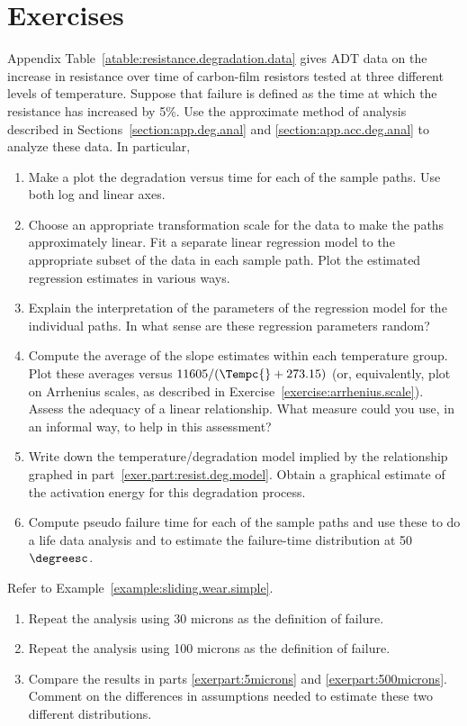 \section*{Exercises}


\begin{exercise}
\label{exercise:resist.deg.data}
Appendix Table~\ref{atable:resistance.degradation.data} gives ADT
data on the increase in resistance over time of carbon-film
resistors tested at three different levels of temperature.  Suppose
that failure is defined as the time at which the resistance has
increased by 5\%. Use the approximate method of analysis described
in Sections~\ref{section:app.deg.anal} and
\ref{section:app.acc.deg.anal} to analyze these data. In particular,
\begin{enumerate}
\item
Make a plot the degradation versus time for each of the sample
paths.  Use both log and linear axes.
\item
Choose an appropriate transformation scale for the data to make the
paths approximately linear. Fit a separate linear regression model
to the appropriate subset of the data in each sample path. Plot the
estimated regression estimates in various ways.
\item
Explain the interpretation of the parameters of the regression model for
the individual paths. In what sense are these regression parameters
random?
\item
\label{exer.part:resist.deg.model}
Compute the average of the slope estimates within each temperature
group.  Plot these averages versus $11605/(\Tempc{} + 273.15)$ (or,
equivalently, plot on Arrhenius scales, as described in
Exercise~\ref{exercise:arrhenius.scale}). Assess the adequacy of a
linear relationship. What measure could you use, in an informal way,
to help in this assessment?
\item
Write down the temperature/degradation model implied by the
relationship graphed in part~\ref{exer.part:resist.deg.model}. Obtain
a graphical estimate of the activation energy for this degradation
process.
\item
Compute pseudo failure time for each of the sample paths and use
these to do a life data analysis and to estimate the failure-time
distribution at 50$\degreesc$.
\end{enumerate}
\end{exercise}

\begin{exercise}
Refer to Example~\ref{example:sliding.wear.simple}.  
\begin{enumerate}
\item
\label{exerpart:5microns}
Repeat the analysis using 30 microns as the definition of failure.
\item
\label{exerpart:500microns}
Repeat the analysis using 100 microns as the definition of failure.
\item
Compare the results in parts 
\ref{exerpart:5microns} and \ref{exerpart:500microns}. Comment on the
differences in assumptions needed to estimate these two different
distributions.
\end{enumerate}
\end{exercise}

